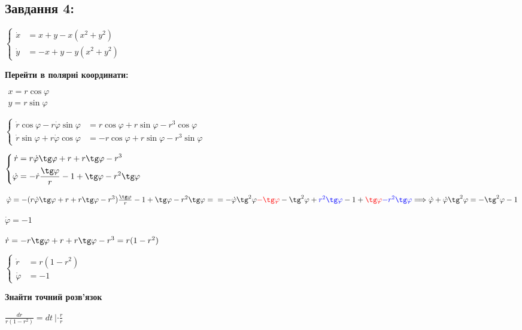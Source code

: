 \subsection{Завдання 4:}

$\left\{\begin{aligned}
    \dot{x} & = x+y-x(x^2 + y^2)\\
    \dot{y} & = -x+y-y(x^2+y^2)
\end{aligned}\right.$

\textbf{Перейти в полярні координати:}

$\begin{aligned}
    x = r\cos\varphi\\
    y = r\sin\varphi
\end{aligned}$

$\left\{\begin{aligned}
    \dot{r}\cos\varphi - r\dot{\varphi}\sin\varphi &= r\cos\varphi + r\sin\varphi-r^3\cos\varphi\\
    \dot{r}\sin\varphi + r\dot{\varphi}\cos\varphi &= -r\cos\varphi + r\sin\varphi-r^3\sin\varphi
\end{aligned}\right.$

$\left\{\begin{aligned}
    \dot{r}  &= r\dot{\varphi}\tg\varphi + r + r\tg\varphi-r^3\\
    \dot{\varphi} &= -\dot{r} \frac{\tg\varphi}{r} -1 + \tg\varphi-r^2\tg\varphi
\end{aligned}\right.$

$\dot{\varphi} = -(r\dot{\varphi}\tg\varphi + r + r\tg\varphi-r^3) \frac{\tg\varphi}{r} -1 + \tg\varphi-r^2\tg\varphi = \\
= - \dot{\varphi}\tg^2\varphi \textcolor{red}{- \tg\varphi} - \tg^2\varphi+\textcolor{blue}{r^2\tg\varphi} -1 + \textcolor{red}{\tg\varphi}\textcolor{blue}{-r^2\tg\varphi} \Longrightarrow 
\dot{\varphi} + \dot{\varphi}\tg^2\varphi = - \tg^2\varphi - 1
$

$\dot{\varphi} = -1$

$\dot{r}  = -r\tg\varphi + r + r\tg\varphi-r^3 = r(1-r^2)$

$\left\{\begin{aligned}
    \dot{r} & = r(1-r^2)\\
    \dot{\varphi} & = -1
\end{aligned}\right.$


\textbf{Знайти точний розв'язок}

$\frac{dr}{r(1-r^2)} = dt \ | \cdot \frac{r}{r}$

